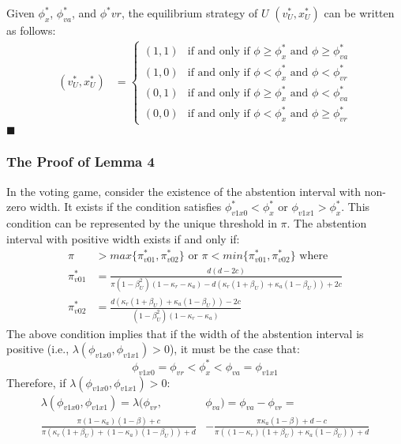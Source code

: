 \par Given $\phi^*_x$, $\phi^*_{va}$, and $\phi^*{vr}$, the equilibrium strategy of $U$ $(v^*_U,x^*_U)$ can be written as follows: 
\begin{align*}
(v^*_U, x^*_U) &= 
\begin{cases}
(1, 1) & \text{if and only if $\phi \geq \phi^*_x$ and $\phi \geq \phi^*_{va}$}\\
(1, 0) & \text{if and only if $\phi < \phi^*_x$ and $\phi < \phi^*_{vr}$}\\
(0, 1) & \text{if and only if $\phi \geq \phi^*_x$ and $\phi < \phi^*_{va}$}\\
(0, 0) & \text{if and only if $\phi < \phi^*_x$ and $\phi \geq \phi^*_{vr}$}
\end{cases}
\end{align*}
\hfill $\blacksquare$

\subsubsection{The Proof of Lemma 4}

\par In the voting game, consider the existence of the abstention interval with non-zero width. It exists if the condition satisfies $\phi^*_{v1x0} < \phi^*_x$ or $\phi_{v1x1} > \phi^*_x$. This condition can be represented by the unique threshold in $\pi$. The abstention interval with positive width exists if and only if:
\begin{align*}
\pi &> max \{\pi^*_{v01}, \pi^*_{v02}\}  \text{ or } \pi < min \{\pi^*_{v01}, \pi^*_{v02} \}  \text{ where } \\
\pi^*_{v01} &= \frac{d( d - 2c ) }{\pi (1 - \beta_U^2) (1- \kappa_{r} - \kappa_{a}) - d ( \kappa_{r} (1 + \beta_U) + \kappa_{a} (1-\beta_U )) + 2c}  \\ 
\pi^*_{v02} &= \frac{d (\kappa_{r}(1 + \beta_U) + \kappa_{a} (1-\beta_U)) - 2c}{(1 -\beta_U^2)(1-\kappa_{r}-\kappa_{a})} 
\end{align*}
\noindent The above condition implies that if the width of the abstention interval is positive (i.e., $\lambda(\phi_{v1x0},\phi_{v1x1})>0$), it must be the case that:
$$\phi_{v1x0}=\phi_{vr}<\phi^*_x<\phi_{va}=\phi_{v1x1}$$
\noindent Therefore, if $\lambda(\phi_{v1x0},\phi_{v1x1})>0$:
\begin{align*}
\lambda(\phi_{v1x0},\phi_{v1x1}) = \lambda(\phi_{vr},&\phi_{va}) = \phi_{va}-\phi_{vr}= \\ 
\frac{\pi (1- \kappa_{a}) (1-\beta) + c}{\pi (\kappa_{r} (1+\beta_U) + (1 - \kappa_{a}) (1-\beta_U)) + d} &- \frac{\pi \kappa_{a} (1-\beta) + d - c}{\pi ( (1-\kappa_{r}) (1+\beta_U) + \kappa_{a} (1-\beta_U)) + d} \\
\end{align*}


